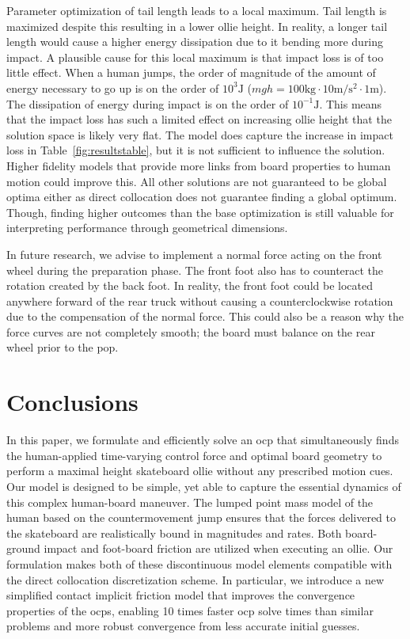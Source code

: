 \documentclass[default,iicol,pdflatex]{sn-jnl}
\begin{document}
Parameter optimization of tail length leads to a local maximum.
Tail length is maximized despite this resulting in a lower ollie height.
In reality, a longer tail length would cause a higher energy dissipation due to it bending more during impact.
A plausible cause for this local maximum is that impact loss is of too little effect.
When a human jumps, the order of magnitude of the amount of energy necessary to go up is on the order of $10^3\si{\joule}$ ($mgh=100\si{\kilo\gram}\cdot10\si{\meter\per\second\squared}\cdot1\si{\meter}$). The dissipation of energy during impact is on the order of $10^{-1}\si{\joule}$.
This means that the impact loss has such a limited effect on increasing ollie height that the solution space is likely very flat.
The model does capture the increase in impact loss in Table~\ref{fig:resultstable}, but it is not sufficient to influence the solution. Higher fidelity models that provide more links from board properties to human motion could improve this.
All other solutions are not guaranteed to be global optima either as direct collocation does not guarantee finding a global optimum.
Though, finding higher outcomes than the base optimization is still valuable for interpreting performance through geometrical dimensions.

In future research, we advise to implement a normal force acting on the front wheel during the preparation phase.
The front foot also has to counteract the rotation created by the back foot.
In reality, the front foot could be located anywhere forward of the rear truck without causing a counterclockwise rotation due to the compensation of the normal force.
This could also be a reason why the force curves are not completely smooth; the board must balance on the rear wheel prior to the pop.

\section{Conclusions}
In this paper, we formulate and efficiently solve an \gls{ocp} that simultaneously finds the human-applied time-varying control force and optimal board geometry to perform a maximal height skateboard ollie without any prescribed motion cues. Our model is designed to be simple, yet able to capture the essential dynamics of this complex human-board maneuver. The lumped point mass model of the human based on the countermovement jump ensures that the forces delivered to the skateboard are realistically bound in magnitudes and rates. Both board-ground impact and foot-board friction are utilized when executing an ollie. Our formulation makes both of these discontinuous model elements compatible with the direct collocation discretization scheme. In particular, we introduce a new simplified contact implicit friction model that improves the convergence properties of the \glspl{ocp}, enabling 10 times faster \gls{ocp} solve times than similar problems and more robust convergence from less accurate initial guesses.
\end{document}
